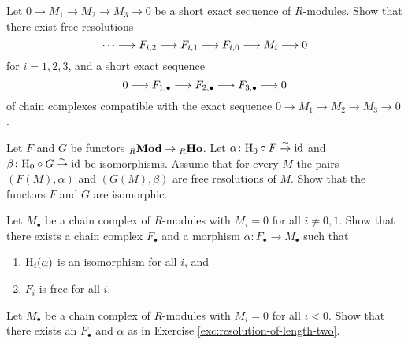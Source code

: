 \begin{exercise}\label{exc:short-exact-sequence-resolutions}
Let $0\to M_1\to M_2 \to M_3 \to 0$ be a short exact sequence of $R$-modules. Show that there exist free resolutions
\[
	\cdots \longrightarrow F_{i,2} \longrightarrow F_{i,1} \longrightarrow F_{i,0} \longrightarrow M_i \longrightarrow 0
\]
for $i=1,2,3$, and a short exact sequence
\[
	0 \longrightarrow F_{1,\bullet} \longrightarrow F_{2,\bullet} \longrightarrow F_{3,\bullet} \longrightarrow 0
\]
of chain complexes compatible with the exact sequence $0\to M_1\to M_2 \to M_3 \to 0$.
\end{exercise}

\begin{exercise}
Let $F$ and $G$ be functors ${}_R\mathbf{Mod} \to {}_R\mathbf{Ho}$. Let $\alpha\colon {\mathrm H}_0\circ F\overset{\sim}{\to} {\rm id}$ and $\beta\colon {\mathrm H}_0\circ G \overset{\sim}{\to} {\rm id}$ be isomorphisms. Assume that for every $M$ the pairs $(F(M),\alpha)$ and $(G(M),\beta)$ are free resolutions of $M$. Show that the functors $F$ and $G$ are isomorphic.
\end{exercise}

\begin{exercise}\label{exc:resolution-of-length-two}
Let $M_\bullet$ be a chain complex of $R$-modules with $M_i=0$ for all $i\not= 0,1$. Show that there exists a chain complex $F_\bullet$ and a morphism $\alpha\colon F_\bullet\to M_\bullet$ such that
\begin{enumerate}
\item ${\mathrm H}_i(\alpha)$ is an isomorphism for all $i$, and
\item $F_i$ is free for all $i$.
\end{enumerate}
\end{exercise}

\begin{exercise}[$\star$] Let $M_\bullet$ be a chain complex of $R$-modules with $M_i=0$ for all $i<0$. Show that there exists an $F_\bullet$ and $\alpha$ as in Exercise \ref{exc:resolution-of-length-two}.
\end{exercise}

